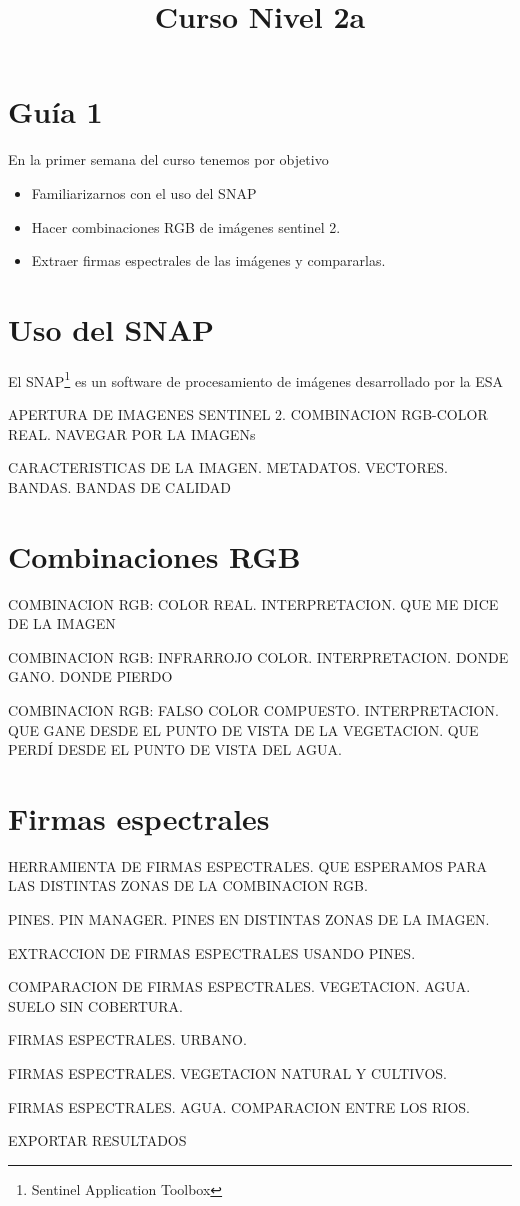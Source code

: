 \documentclass[a4paper]{article}
\title{Curso Nivel 2a}
\begin{document}
\section{Guía 1}
En la primer semana del curso tenemos por objetivo
\begin{itemize}
    \item Familiarizarnos con el uso del SNAP
    \item Hacer combinaciones RGB de imágenes sentinel 2.
    \item Extraer firmas espectrales de las imágenes y compararlas.
\end{itemize}

\section{Uso del SNAP}

El SNAP\footnote{Sentinel Application Toolbox} es un software de procesamiento de imágenes desarrollado por la ESA

APERTURA DE IMAGENES SENTINEL 2. COMBINACION RGB-COLOR REAL. NAVEGAR POR LA IMAGENs

CARACTERISTICAS DE LA IMAGEN. METADATOS. VECTORES. BANDAS. BANDAS DE CALIDAD

\section{Combinaciones RGB}

COMBINACION RGB: COLOR REAL. INTERPRETACION. QUE ME DICE DE LA IMAGEN

COMBINACION RGB: INFRARROJO COLOR. INTERPRETACION. DONDE GANO. DONDE PIERDO

COMBINACION RGB: FALSO COLOR COMPUESTO. INTERPRETACION. QUE GANE DESDE EL PUNTO DE VISTA DE LA VEGETACION. QUE PERDÍ DESDE EL PUNTO DE VISTA DEL AGUA.

\section{Firmas espectrales}

HERRAMIENTA DE FIRMAS ESPECTRALES. QUE ESPERAMOS PARA LAS DISTINTAS ZONAS DE LA COMBINACION RGB.

PINES. PIN MANAGER. PINES EN DISTINTAS ZONAS DE LA IMAGEN.

EXTRACCION DE FIRMAS ESPECTRALES USANDO PINES.

COMPARACION DE FIRMAS ESPECTRALES. VEGETACION. AGUA. SUELO SIN COBERTURA.

FIRMAS ESPECTRALES. URBANO.

FIRMAS ESPECTRALES. VEGETACION NATURAL Y CULTIVOS.

FIRMAS ESPECTRALES. AGUA. COMPARACION ENTRE LOS RIOS.

EXPORTAR RESULTADOS
\end{document}
